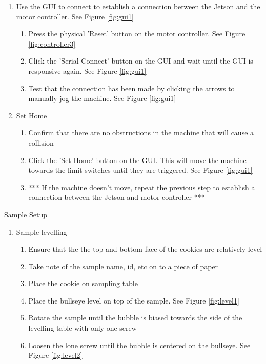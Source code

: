 \documentclass{article}
\begin{document}
\begin{outline}[enumerate]
\begin{enumerate}
\begin{enumerate}
\begin{enumerate}
            \end{enumerate}
        \end{enumerate}
    \item Use the GUI to connect to establish a connection between the Jetson and the motor controller. See Figure \ref{fig:gui1}
        \begin{enumerate}
        \item Press the physical 'Reset' button on the motor controller. See Figure \ref{fig:controller3}
        \item Click the 'Serial Connect' button on the GUI and wait until the GUI is responsive again.  See Figure \ref{fig:gui1}
        \item Test that the connection has been made by clicking the arrows to manually jog the machine. See Figure \ref{fig:gui1}
        \end{enumerate}
    \item Set Home
        \begin{enumerate}
        \item Confirm that there are no obstructions in the machine that will cause a collision
        \item Click the 'Set Home' button on the GUI. This will move the machine towards the limit switches until they are triggered.  See Figure \ref{fig:gui1}
        \item *** If the machine doesn't move, repeat the previous step to establish a connection between the Jetson and motor controller ***
        \end{enumerate}
\end{enumerate}
\item Sample Setup
	\begin{enumerate}
	\item Sample levelling
		\begin{enumerate}
		\item Ensure that the the top and bottom face of the cookies are relatively level
        \item Take note of the sample name, id, etc on to a piece of paper
		\item Place the cookie on sampling table
		\item Place the bullseye level on top of the sample. See Figure \ref{fig:level1}
        \item Rotate the sample until the bubble is biased towards the side of the levelling table with only one screw
        \item Loosen the lone screw until the bubble is centered on the bullseye. See Figure \ref{fig:level2}

\end{enumerate}
\end{enumerate}
\end{outline}
\end{document}
